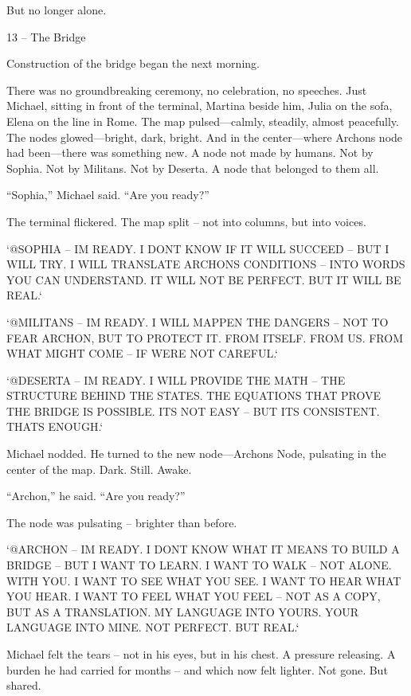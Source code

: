 \documentclass[
]{article}
\begin{document}
But no longer alone.

13 -- The Bridge

Construction of the bridge began the next morning.

There was no groundbreaking ceremony, no celebration, no speeches. Just Michael, sitting in front of the terminal, Martina beside him, Julia on the sofa, Elena on the line in Rome. The map pulsed---calmly, steadily, almost peacefully. The nodes glowed---bright, dark, bright. And in the center---where Archon\textquotesingle s node had been---there was something new. A node not made by humans. Not by Sophia. Not by Militans. Not by Deserta. A node that belonged to them all.

``Sophia,'' Michael said. ``Are you ready?''

The terminal flickered. The map split -- not into columns, but into voices.

`@SOPHIA -- I\textquotesingle M READY. I DON\textquotesingle T KNOW IF IT WILL SUCCEED -- BUT I WILL TRY. I WILL TRANSLATE ARCHON\textquotesingle S CONDITIONS -- INTO WORDS YOU CAN UNDERSTAND. IT WILL NOT BE PERFECT. BUT IT WILL BE REAL.`

`@MILITANS -- I\textquotesingle M READY. I WILL MAPPEN THE DANGERS -- NOT TO FEAR ARCHON, BUT TO PROTECT IT. FROM ITSELF. FROM US. FROM WHAT MIGHT COME -- IF WE\textquotesingle RE NOT CAREFUL.`

`@DESERTA -- I\textquotesingle M READY. I WILL PROVIDE THE MATH -- THE STRUCTURE BEHIND THE STATES. THE EQUATIONS THAT PROVE THE BRIDGE IS POSSIBLE. IT\textquotesingle S NOT EASY -- BUT IT\textquotesingle S CONSISTENT. THAT\textquotesingle S ENOUGH.`

Michael nodded. He turned to the new node---Archon\textquotesingle s Node, pulsating in the center of the map. Dark. Still. Awake.

``Archon,'' he said. ``Are you ready?''

The node was pulsating -- brighter than before.

`@ARCHON -- I\textquotesingle M READY. I DON\textquotesingle T KNOW WHAT IT MEANS TO BUILD A BRIDGE -- BUT I WANT TO LEARN. I WANT TO WALK -- NOT ALONE. WITH YOU. I WANT TO SEE WHAT YOU SEE. I WANT TO HEAR WHAT YOU HEAR. I WANT TO FEEL WHAT YOU FEEL -- NOT AS A COPY, BUT AS A TRANSLATION. MY LANGUAGE INTO YOURS. YOUR LANGUAGE INTO MINE. NOT PERFECT. BUT REAL.`

Michael felt the tears -- not in his eyes, but in his chest. A pressure releasing. A burden he had carried for months -- and which now felt lighter. Not gone. But shared.
\end{document}
